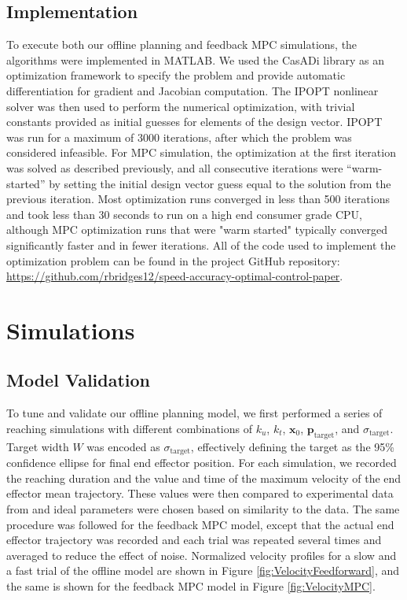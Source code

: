 \documentclass[letterpaper, 10pt, conference]{ieeeconf}
\begin{document}
\subsection{Implementation}
To execute both our offline planning and feedback MPC simulations, the algorithms were implemented in MATLAB. 
We used the CasADi library \cite{casadi} as an optimization framework to specify the problem and provide automatic differentiation for gradient and Jacobian computation. The IPOPT nonlinear solver was then used to perform the numerical optimization, with trivial constants provided as initial guesses for elements of the design vector. 
IPOPT was run for a maximum of 3000 iterations, after which the problem was considered infeasible. For MPC simulation, the optimization at the first iteration was solved as described previously, and all consecutive iterations were ``warm-started'' by setting the initial design vector guess equal to the solution from the previous iteration. Most optimization runs converged in less than 500 iterations and took less than 30 seconds to run on a high end consumer grade CPU, although MPC optimization runs that were "warm started" typically converged significantly faster and in fewer iterations. All of the code used to implement the optimization problem can be found in the project GitHub repository: \href{https://github.com/rbridges12/speed-accuracy-optimal-control-paper}{https://github.com/rbridges12/speed-accuracy-optimal-control-paper}.

\section{Simulations}
\subsection{Model Validation}

To tune and validate our offline planning model, we first performed a series of reaching simulations with different combinations of $k_u$, $k_t$, $\mathbf{x}_0$, $\mathbf{p}_{\text{target}}$, and $\sigma_{\text{target}}$. Target width $W$ was encoded as $\sigma_{\text{target}}$, effectively defining the target as the 95\% confidence ellipse for final end effector position. For each simulation, we recorded the reaching duration and the value and time of the maximum velocity of the end effector mean trajectory. These values were then compared to experimental data from \cite{fitts_law_exp_data} and ideal parameters were chosen based on similarity to the data. The same procedure was followed for the feedback MPC model, except that the actual end effector trajectory was recorded and each trial was repeated several times and averaged to reduce the effect of noise.
Normalized velocity profiles for a slow and a fast trial of the offline model are shown in Figure \ref{fig:VelocityFeedforward}, and the same is shown for the feedback MPC model in Figure \ref{fig:VelocityMPC}.
\end{document}
